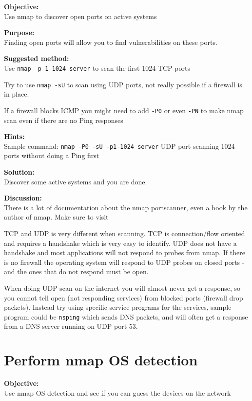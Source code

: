 \documentclass[a4paper,11pt,notitlepage]{report}
\begin{document}
{\bf Objective:} \\
Use nmap to discover open ports on active systems

{\bf Purpose:}\\
Finding open ports will allow you to find vulnerabilities on these ports.

{\bf Suggested method:}\\
Use \verb+nmap -p 1-1024 server+ to scan the first 1024 TCP
ports

Try to use \verb+nmap -sU+ to scan using UDP ports, not really possible if a firewall is in place.

If a firewall blocks ICMP you might need to add \verb+-P0+
or even \verb+-PN+ to make nmap scan even if there are no Ping responses

{\bf Hints:} \\
Sample command: \verb+nmap -P0 -sU -p1-1024 server+ UDP port scanning
1024 ports without doing a Ping first

{\bf Solution:}\\
Discover some active systems and you are done.

{\bf Discussion:}\\
There is a lot of documentation about the nmap portscanner, even a book by the author
of nmap. Make sure to visit 

TCP and UDP is very different when scanning. TCP is connection/flow oriented and requires a handshake which is very easy to identify. UDP does not have a handshake and most applications will not respond to probes from nmap. If there is no firewall the operating system will respond to UDP probes on closed ports - and the ones that do not respond must be open.

When doing UDP scan on the internet you will almost never get a response, so you cannot tell open (not responding services) from blocked ports (firewall drop packets). Instead try using specific service programs for the services, sample program could be \verb+nsping+ which sends DNS packets, and will often get a response from a DNS server running on UDP port 53.

\chapter{Perform nmap OS detection}
\label{ex:nmap-os}

{\bf Objective:} \\
Use nmap OS detection and see if you can guess the devices on the network
\end{document}
